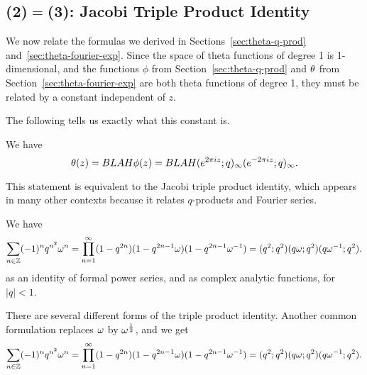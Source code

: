 \subsection{(2)$=$(3): Jacobi Triple Product Identity}

We now relate the formulas we derived in Sections~\ref{sec:theta-q-prod} and~\ref{sec:theta-fourier-exp}. Since the space of theta functions of degree 1 is 1-dimensional, and the functions $\phi$ from Section~\ref{sec:theta-q-prod} and $\theta$ from Section~\ref{sec:theta-fourier-exp} are both theta functions of degree 1, they must be related by a constant independent of $z$.

The following tells us exactly what this constant is.
\begin{pr}
We have
\[
\theta(z)=BLAH \phi(z)=BLAH (e^{2\pi iz}; q)_{\infty}(e^{-2\pi i z};q)_{\infty}.
\]
\end{pr}
This statement is equivalent to the Jacobi triple product identity, which appears in many other contexts because it relates $q$-products and Fourier series.
\begin{thm}
We have
\[
\sum_{n\in \mathbb{Z}}(-1)^nq^{n^2}\omega^n=\prod_{n=1}^{\infty} (1-q^{2n})(1-q^{2n-1}\omega)(1-q^{2n-1}\omega^{-1})=(q^2;q^2)(q\omega;q^2)(q\omega^{-1};q^2).
\]
as an identity of formal power series, and as complex analytic functions, for $|q|<1$.
\end{thm}
\begin{rem}
There are several different forms of the triple product identity. Another common formulation replaces $\omega$ by $\omega^{\frac{1}{2}}$, and we get
\[
\sum_{n\in \mathbb{Z}}(-1)^nq^{n^2}\omega^n=\prod_{n=1}^{\infty} (1-q^{2n})(1-q^{2n-1}\omega)(1-q^{2n-1}\omega^{-1})=(q^2;q^2)(q\omega;q^2)(q\omega^{-1};q^2).
\]
\end{rem}

